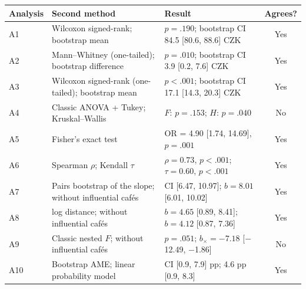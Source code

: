 \begin{tabular}{lp{4.8cm}p{7.4cm}c}
\toprule
Analysis & Second method & Result & Agrees? \\
\midrule
A1 & Wilcoxon signed-rank; bootstrap mean & $p = .190$; bootstrap CI 84.5 [80.6, 88.6] CZK & Yes \\
A2 & Mann--Whitney (one-tailed); bootstrap difference & $p = .010$; bootstrap CI 3.9 [0.2, 7.6] CZK & Yes \\
A3 & Wilcoxon signed-rank (one-tailed); bootstrap mean & $p < .001$; bootstrap CI 17.1 [14.3, 20.3] CZK & Yes \\
A4 & Classic ANOVA + Tukey; Kruskal--Wallis & $F$: $p = .153$; $H$: $p = .040$ & No \\
A5 & Fisher's exact test & OR = 4.90 [1.74, 14.69], $p = .001$ & Yes \\
A6 & Spearman $\rho$; Kendall $\tau$ & $\rho = 0.73$, $p < .001$; $\tau = 0.60$, $p < .001$ & Yes \\
A7 & Pairs bootstrap of the slope; without influential caf\'es & CI [6.47, 10.97]; $b = 8.01$ [6.01, 10.02] & Yes \\
A8 & log distance; without influential caf\'es & $b = 4.65$ [0.89, 8.41]; $b = 4.12$ [0.87, 7.36] & Yes \\
A9 & Classic nested $F$; without influential caf\'es & $p = .051$; $b_{\times} = \ensuremath{-}7.18$ [\ensuremath{-}12.49, \ensuremath{-}1.86] & No \\
A10 & Bootstrap AME; linear probability model & CI [0.9, 7.9] pp; 4.6 pp [0.9, 8.3] & Yes \\
\bottomrule
\end{tabular}
